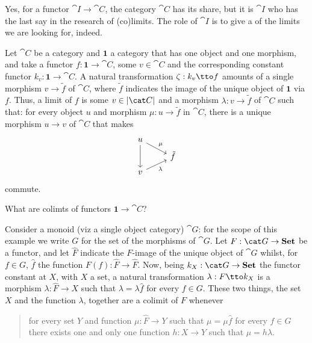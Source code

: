 
Yes, for a functor \(\cat I \to \cat C\), the category \(\cat C\) has its share, but it is \(\cat I\) who has the last say in the research of (co)limits. The role of \(\cat I\) is to give a  of the limits we are looking for, indeed.

\begin{example}
Let \(\cat C\) be a category and \(\mathbf 1\) a category that has one object and one morphism, and take a functor \(f : \mathbf 1 \to \cat C\), some \(v \in \cat C\) and the corresponding constant functor \(k_v : \mathbf 1 \to \cat C\). A natural transformation \(\zeta : k_v \tto f\) amounts of a single morphism \(v \to \tilde f\) of \(\cat C\), where \(\tilde f\) indicates the image of the unique object of \(\mathbf 1\) via \(f\). Thus, a limit of \(f\) is some \(v \in \obj{\cat C}\) and a morphism \(\lambda : v \to \tilde f\) of \(\cat C\) such that: for every object \(u\) and morphism \(\mu : u \to \tilde f\) in \(\cat C\), there is a unique morphism \(u \to v\) of \(\cat C\) that makes
\[\begin{tikzcd}[row sep=tiny]
u \ar["\mu", dr] \ar[dd] \\
& \tilde f \\
v \ar["\lambda", ur, swap]
\end{tikzcd}\]
commute.
\end{example}

\begin{exercise}
What are colimts of functors \(\mathbf 1 \to \cat C\)?
\end{exercise}

\begin{sandbox}
Consider a monoid (viz a single object category) \(\cat G\): for the scope of this example we write \(G\) for the set of the morphisms of \(\cat G\). Let \(F : \cat G \to \Set\) be a functor, and let \(\hat F\) indicate the \(F\)-image of the unique object of \(\cat G\) whilst, for \(f \in G\), \(\hat f\) the function \(F(f) : \hat F \to \hat F\). Now, being \(k_X : \cat G \to \Set\) the functor constant at \(X\), with \(X\) a set, a natural transformation \(\lambda : F \tto k_X\) is a morphism \(\lambda : \hat F \to X\) such that \(\lambda = \lambda \hat f\) for every \(f \in G\). These two things, the set \(X\) and the function \(\lambda\), together are a colimit of \(F\) whenever
\begin{quotation}
for every set \(Y\) and function \(\mu : \hat F \to Y\) such that \(\mu = \mu \hat f\) for every \(f \in G\) there exists one and only one function \(h : X \to Y\) such that \(\mu = h \lambda\).
\end{quotation}
 
\end{sandbox}

